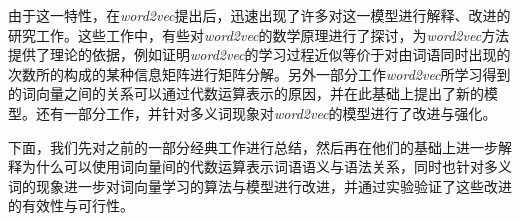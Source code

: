 由于这一特性，在\emph{word2vec}提出后，迅速出现了许多对这一模型进行解释、改进的研究工作\citep{li2015word,levy2014neural,pennington2014glove,huang2012improving}。这些工作中，有些对\emph{word2vec}的数学原理进行了探讨，为\emph{word2vec}方法提供了理论的依据，例如\citep{li2015word,levy2014neural}证明\emph{word2vec}的学习过程近似等价于对由词语同时出现的次数所的构成的某种信息矩阵进行矩阵分解。另外一部分工作\emph{word2vec}所学习得到的词向量之间的关系可以通过代数运算表示的原因，并在此基础上提出了新的模型\citep{pennington2014glove}。还有一部分工作，并针对多义词现象对\emph{word2vec}的模型进行了改进与强化\citep{huang2012improving}。

下面，我们先对之前的一部分经典工作进行总结，然后再在他们的基础上进一步解释为什么可以使用词向量间的代数运算表示词语语义与语法关系，同时也针对多义词的现象进一步对词向量学习的算法与模型进行改进，并通过实验验证了这些改进的有效性与可行性。
